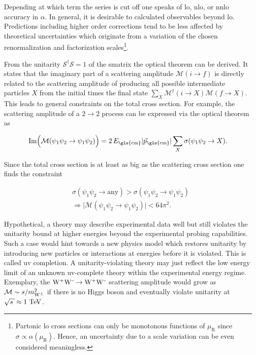 
Depending at which term the series is cut off one speaks of \gls{lo}, \gls{nlo}, or \gls{nnlo} accuracy in $\alpha$. In general, it is desirable to calculated observables beyond \gls{lo}. Predictions including higher order corrections tend to be less affected by theoretical uncertainties which originate from a variation of the chosen renormalization and factorization scales\footnote{Partonic \gls{lo} cross sections can only be monotonous functions of $\mu_\mathrm{R}$ since $\sigma\propto\alpha(\mu_\mathrm{R})$. Hence, an uncertainty due to a scale variation can be even considered meaningless.}.

From the unitarity $\mathcal{S}^{\dagger}\mathcal{S}=1$ of the \gls{smatrix} the optical theorem can be derived. It states that the imaginary part of a scattering amplitude $\mathcal{M}(i\to f)$ is directly related to the scattering amplitude of producing all possible intermediate particles $X$ from the initial times the final state $\sum_{X}\mathcal{M}^\dagger(i\to X)\mathcal{M}(f\to X)$. This leads to general constraints on the total cross section. For example, the scattering amplitude of a $2\to2$ process can be expressed via the optical theorem as

\begin{equation}
\mathrm{Im}\Big(\mathcal{M}(\psi_{1}\psi_{2}\to\psi_{1}\psi_{2})\Big)=2\,E_\mathrm{\gls{cm}}|\vec{p}_\mathrm{\gls{cm}}|\sum_{X}\sigma(\psi_{1}\psi_{2}\to X).
\end{equation}

Since the total cross section is at least as big as the scattering cross section one finds the constraint

\begin{align}
&\sigma(\psi_{1}\psi_{2}\to \mathrm{any})>\sigma(\psi_{1}\psi_{2}\to \psi_{1}\psi_{2}) \\
&\Rightarrow\Big|\mathcal{M}(\psi_{1}\psi_{2}\to\psi_{1}\psi_{2})\Big|<64\pi^2.
\end{align}


Hypothetical, a theory may describe experimental data well but still violates the unitarity bound at higher energies beyond the experimental probing capabilities. Such a case would hint towards a new physics model which restores unitarity by introducing new particles or interactions at energies before it is violated. This is called \gls{uv} completion. A unitarity-violating theory may just reflect the low energy limit of an unknown \gls{uv}-complete theory within the experimental energy regime. Exemplary,  the $\mathrm{W}^{\rmplus}\mathrm{W}^{\rmminus}\to\mathrm{W}^{\rmplus}\mathrm{W}^{\rmminus}$ scattering amplitude would grow as $\mathcal{M}\sim s/m_{\mathrm{W}^{\pm}}^2$ if there is no Higgs boson and eventually violate unitarity at $\sqrt{s}\approx1~\TeV$.


